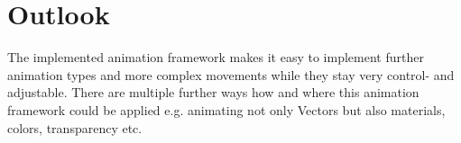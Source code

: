 \section{Outlook}

The implemented animation framework makes it easy to implement further animation types and more complex movements while they stay very control- and adjustable. There are multiple further ways how and where this animation framework could be applied e.g. animating not only Vectors but also materials, colors, transparency etc.